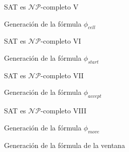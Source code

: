 \documentclass[10pt, mathserif, profesionalfont]{beamer}
\begin{document}
\begin{frame}{SAT es $\mathcal{NP}$-completo V}

\begin{block}{Generación de la fórmula $\phi_{cell}$}
\end{block}

\end{frame}


\begin{frame}{SAT es $\mathcal{NP}$-completo VI}

\begin{block}{Generación de la fórmula $\phi_{start}$}
\end{block}

\end{frame}


\begin{frame}{SAT es $\mathcal{NP}$-completo VII}

\begin{block}{Generación de la fórmula $\phi_{accept}$}
\end{block}

\end{frame}

\begin{frame}{SAT es $\mathcal{NP}$-completo VIII}

\begin{block}{Generación de la fórmula $\phi_{move}$}
\end{block}

\begin{block}{Generación de la fórmula de la ventana}
\end{block}

\end{frame}
\end{document}
